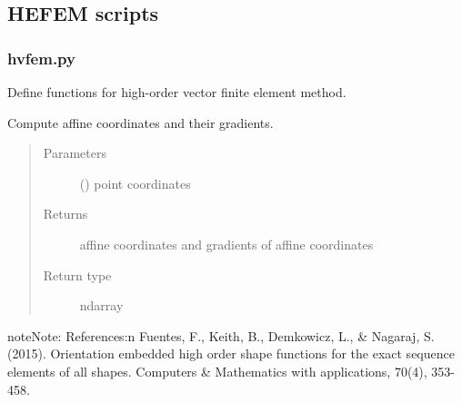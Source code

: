 \documentclass[letterpaper,10pt,english]{sphinxmanual}
\begin{document}
\subsection{HEFEM scripts}
\label{\detokenize{Manual:hefem-scripts}}

\subsubsection{hvfem.py}
\label{\detokenize{petgem/hvfem:module-petgem.hvfem}}\label{\detokenize{petgem/hvfem:hvfem-py}}\label{\detokenize{petgem/hvfem::doc}}
Define functions for high-order vector finite element method.

\begin{fulllineitems}
\label{\detokenize{petgem/hvfem:petgem.hvfem.AffineTetrahedron}}
Compute affine coordinates and their gradients.
\begin{quote}\begin{description}
\item[{Parameters}] \leavevmode
{} () \textendash{} point coordinates

\item[{Returns}] \leavevmode
affine coordinates and gradients of affine coordinates

\item[{Return type}] \leavevmode
ndarray

\end{description}\end{quote}

\begin{sphinxadmonition}{note}{Note:}
References:n
Fuentes, F., Keith, B., Demkowicz, L., \& Nagaraj, S. (2015). Orientation
embedded high order shape functions for the exact sequence elements of
all shapes. Computers \& Mathematics with applications, 70(4), 353-458.
\end{sphinxadmonition}

\end{fulllineitems}

\end{document}
